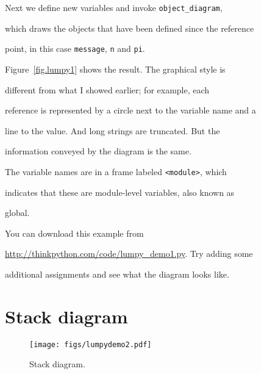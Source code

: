 Next we define new variables and invoke \verb"object_diagram",

which draws the objects that have been defined since the reference

point, in this case {\tt message}, {\tt n} and {\tt pi}.



Figure~\ref{fig.lumpy1} shows the result.  The graphical style is

different from what I showed earlier; for example, each

reference is represented by a circle next to the variable name and a

line to the value.  And long strings are truncated.  But the

information conveyed by the diagram is the same.



The variable names are in a frame labeled \verb"<module>", which

indicates that these are module-level variables, also known as

global.







You can download this example from

\url{http://thinkpython.com/code/lumpy_demo1.py}.  Try adding some

additional assignments and see what the diagram looks like.





\section{Stack diagram}



\begin{figure}

\centerline

{\texttt{[image: figs/lumpydemo2.pdf]}}

\caption{Stack diagram.}

\label{fig.lumpy2}

\end{figure}



